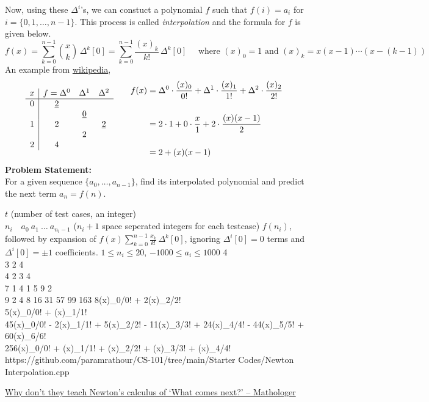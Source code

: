 \documentclass[../../Problems]{subfiles}
\begin{document}
Now, using these $\Delta ^{i}$'s, we can constuct a polynomial $f$ such that $f(i)=a_i$ for $i=\{0,1,\ldots,n-1\}$. This process is called \emph{interpolation} and the formula for $f$ is given below.
\begin{equation}
	f(x)=\sum _{k=0}^{n-1}{\binom {x}{k}}\,\Delta ^{k}[0]=\sum _{k=0}^{n-1}\frac{(x)_k}{k!}\,\Delta ^{k}[0]%
	\quad\text{ where $(x)_0 = 1$ and $(x)_k=x(x-1)\cdots(x-(k-1))$}
\end{equation}
An example from \href{https://en.wikipedia.org/wiki/Finite_difference#Newton's_series}{wikipedia},
\vspace{-1em}\begin{equation}
	{{
	\begin{matrix}{
	\begin{array}{c|ccc} x&f=\Delta ^{0}&\Delta ^{1}&\Delta ^{2}\\\hline 0&{\underline {2}}&&\\
	&&{\underline {0}}&\\
	1&2&&{\underline {2}}\\
	&&2&\\
	2&4&&
	\end{array}}
	&\quad {
	\begin{aligned}
	f(x)&=\Delta ^{0}\cdot {\dfrac {(x)_{0}}{0!}}+\Delta ^{1}\cdot {\dfrac {(x)_{1}}{1!}}+\Delta ^{2}\cdot {\dfrac {(x)_{2}}{2!}}\quad\\\\
	&=2\cdot 1+0\cdot {\dfrac {x}{1}}+2\cdot {\dfrac {(x)(x-1)}{2}}\\\\
	&=2+(x)(x-1)
	\end{aligned}}\end{matrix}}}\vspace{-0.5em}
\end{equation}
\textbf{Problem Statement:}\\
For a given sequence $\{a_0,\ldots,a_{n-1}\}$, find its interpolated polynomial and predict the next term $a_{n}=f(n)$.
\begin{testcases}
	{$t$ \hfill(number of test cases, an integer)\\$n_i\quad a_{0}\ a_1\ \ldots\ a_{n_i-1}$ \hfill($n_i+1$ space seperated integers for each testcase)}
	{$f(n_i)$, followed by expansion of $f(x)\displaystyle\sum _{k=0}^{n-1}\frac{x_k}{k!}\,\Delta ^{k}[0]$, ignoring $\Delta ^{i}[0]=0$ terms and $\Delta ^{i}[0]=\pm1$ coefficients.}
	{$1 \leq n_i \leq 20$, $-1000 \leq a_i \leq 1000$}
	{4\\3 2 4\\4 2 3 4\\7 1 4 1 5 9 2\\9 2 4 8 16 31 57 99 163}
	{8(x)\_{0}/0! + 2(x)\_{2}/2!\\5\quad(x)\_{0}/0! + (x)\_{1}/1!\\45(x)\_{0}/0! - 2(x)\_{1}/1! + 5(x)\_{2}/2! - 11(x)\_{3}/3! + 24(x)\_{4}/4! - 44(x)\_{5}/5! + 60(x)\_{6}/6!\\256\quad(x)\_{0}/0! + (x)\_{1}/1! + (x)\_{2}/2! + (x)\_{3}/3! + (x)\_{4}/4!}
	{https://github.com/paramrathour/CS-101/tree/main/Starter Codes/Newton Interpolation.cpp}
\end{testcases}
\begin{funvideo}
	\href{https://youtu.be/4AuV93LOPcE}{Why don't they teach Newton's calculus of `What comes next?' -- Mathologer}
\end{funvideo}
\end{document}
